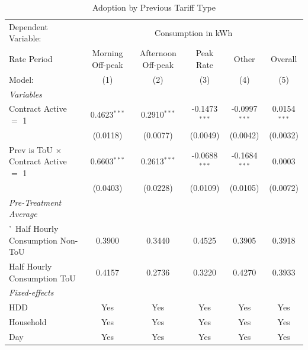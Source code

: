 
\begin{table}[htbp]
   \caption{\label{tab:prevrav} Adoption by Previous Tariff Type}
   \centering
   \begin{tabular}{lccccc}
      \tabularnewline \midrule \midrule
      Dependent Variable: & \multicolumn{5}{c}{Consumption in kWh}\\
      Rate Period                                 & Morning Off-peak & Afternoon Off-peak & Peak Rate       & Other           & Overall \\   
      Model:                                      & (1)              & (2)                & (3)             & (4)             & (5)\\  
      \midrule
      \emph{Variables}\\
      Contract Active $=$ 1                       & 0.4623$^{***}$   & 0.2910$^{***}$     & -0.1473$^{***}$ & -0.0997$^{***}$ & 0.0154$^{***}$\\   
                                                  & (0.0118)         & (0.0077)           & (0.0049)        & (0.0042)        & (0.0032)\\   
      Prev is ToU $\times$ Contract Active $=$ 1  & 0.6603$^{***}$   & 0.2613$^{***}$     & -0.0688$^{***}$ & -0.1684$^{***}$ & 0.0003\\   
                                                  & (0.0403)         & (0.0228)           & (0.0109)        & (0.0105)        & (0.0072)\\   
      \midrule
\emph{Pre-Treatment Average}&  & & & & \\  '\
      Half Hourly Consumption Non-ToU             & 0.3900           & 0.3440             & 0.4525          & 0.3905          & 0.3918\\  
      Half Hourly Consumption ToU                 & 0.4157           & 0.2736             & 0.3220          & 0.4270          & 0.3933\\  
\midrule
      \emph{Fixed-effects}\\
      HDD                                         & Yes              & Yes                & Yes             & Yes             & Yes\\  
      Household                                   & Yes              & Yes                & Yes             & Yes             & Yes\\  
      Day                                         & Yes              & Yes                & Yes             & Yes             & Yes\\  
      \midrule

\end{tabular}
\end{table}
